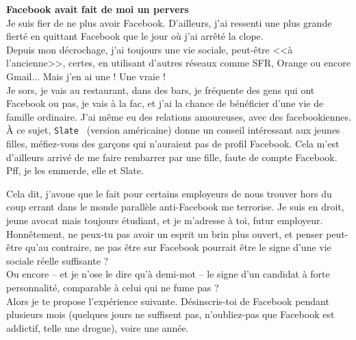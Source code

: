 \documentclass[11pt,twoside,a4paper]{article}
\begin{document}
\textbf{Facebook avait fait de moi un pervers}~\\

Je suis fier de ne plus avoir Facebook. D'ailleurs, j'ai ressenti une plus grande fiert{\'e} en quittant Facebook que le jour o{\`u} j'ai arr{\^e}t{\'e} la clope. ~\\

Depuis mon d{\'e}crochage, j'ai toujours une vie sociale, peut-{\^e}tre <<{\`a} l'ancienne>>, certes, en utilisant d'autres r{\'e}seaux comme SFR, Orange ou encore Gmail... Mais j'en ai une ! Une vraie ! ~\\

Je sors, je vais au restaurant, dans des bars, je fr{\'e}quente des gens qui ont Facebook ou pas, je vais {\`a} la fac, et j'ai la chance de b{\'e}n{\'e}ficier d'une vie de famille ordinaire. J'ai m{\^e}me eu des relations amoureuses, avec des facebookiennes. {\`A} ce sujet, \texttt{Slate~\footnotemark} (version am{\'e}ricaine) donne un conseil int{\'e}ressant aux jeunes filles, m{\'e}fiez-vous des gar\c{c}ons qui n'auraient pas de profil Facebook. Cela m'est d'ailleurs arriv{\'e} de me faire rembarrer par une fille, faute de compte Facebook. Pff, je les emmerde, elle et Slate. ~\\

Cela dit, j'avoue que le fait pour certains employeurs de nous trouver hors du coup errant dans le monde parall{\`e}le anti-Facebook me terrorise. Je suis en droit, jeune avocat mais toujours {\'e}tudiant, et je m'adresse {\`a} toi, futur employeur. ~\\

Honn{\^e}tement, ne peux-tu pas avoir un esprit un brin plus ouvert, et penser peut-{\^e}tre qu'au contraire, ne pas {\^e}tre sur Facebook pourrait {\^e}tre le signe d'une vie sociale r{\'e}elle suffisante ? ~\\

Ou encore -- et je n'ose le dire qu'{\`a} demi-mot -- le signe d'un candidat {\`a} forte personnalit{\'e}, comparable {\`a} celui qui ne fume pas ? ~\\

Alors je te propose l'exp{\'e}rience suivante. D{\'e}sinscris-toi de Facebook pendant plusieurs mois (quelques jours ne suffisent pas, n'oubliez-pas que Facebook est addictif, telle une drogue), voire une ann{\'e}e. ~\\
\end{document}
